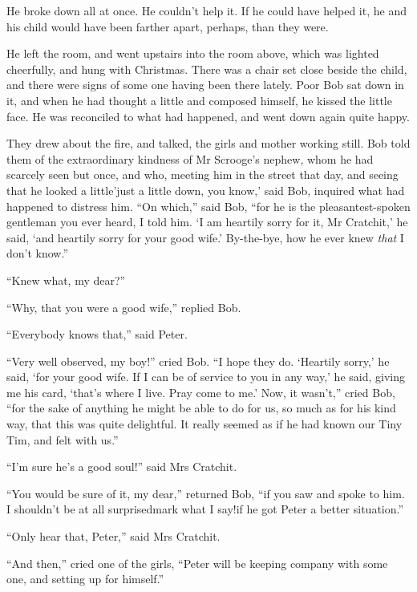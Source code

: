 \documentclass[paper=5.5in:8.5in,BCOR=7mm,twoside,DIV=calc,12pt,usegeometry]{scrbook} %
\begin{document}
He broke down all at once. He couldn't help it. If he could have helped it, he and his child would have been farther apart, perhaps, than they were.

He left the room, and went upstairs into the room above, which was lighted cheerfully, and hung with Christmas. There was a chair set close beside the child, and there were signs of some one having been there lately. Poor Bob sat down in it, and when he had thought a little and composed himself, he kissed the little face. He was reconciled to what had happened, and went down again quite happy.

They drew about the fire, and talked, the girls and mother working still. Bob told them of the extraordinary kindness of Mr Scrooge's nephew, whom he had scarcely seen but once, and who, meeting him in the street that day, and seeing that he looked a little\textemdash 'just a little down, you know,' said Bob, inquired what had happened to distress him. \enquote{On which,} said Bob, \enquote{for he is the pleasantest-spoken gentleman you ever heard, I told him. \enquote{I am heartily sorry for it, Mr Cratchit,} he said, \enquote{and heartily sorry for your good wife.} By-the-bye, how he ever knew \textit{that} I don't know.}

\enquote{Knew what, my dear?}

\enquote{Why, that you were a good wife,} replied Bob.

\enquote{Everybody knows that,} said Peter.

\enquote{Very well observed, my boy!} cried Bob. \enquote{I hope they do. \enquote{Heartily sorry,} he said, \enquote{for your good wife. If I can be of service to you in any way,} he said, giving me his card, \enquote{that's where I live. Pray come to me.} Now, it wasn't,} cried Bob, \enquote{for the sake of anything he might be able to do for us, so much as for his kind way, that this was quite delightful. It really seemed as if he had known our Tiny Tim, and felt with us.}

\enquote{I'm sure he's a good soul!} said Mrs Cratchit.

\enquote{You would be sure of it, my dear,} returned Bob, \enquote{if you saw and spoke to him. I shouldn't be at all surprised\textemdash mark what I say!\textemdash if he got Peter a better situation.}

\enquote{Only hear that, Peter,} said Mrs Cratchit.

\enquote{And then,} cried one of the girls, \enquote{Peter will be keeping company with some one, and setting up for himself.}
\end{document}
